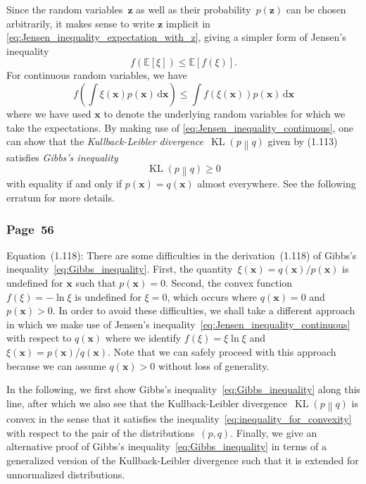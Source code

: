 \documentclass[12pt,a4paper]{article}
\newcommand{\erratum}[1]{%
\subsubsection*{#1}
\addcontentsline{toc}{subsection}{#1}}
\begin{document}
Since the random variables~$\mathbf{z}$ as well as their probability~$p(\mathbf{z})$ can be chosen
arbitrarily,
it makes sense to write $\mathbf{z}$ implicit in \eqref{eq:Jensen_inequality_expectation_with_z},
giving a simpler form of Jensen's inequality
\begin{equation}
f\left(\mathbb{E}\left[\xi\right]\right)
\leqslant \mathbb{E}\left[f\left(\xi\right)\right] .
\end{equation}
For continuous random variables, we have
\begin{equation}
f\left(\int\xi(\mathbf{x}) p(\mathbf{x}) \,\mathrm{d}\mathbf{x}\right) \leqslant
\int f\left(\xi(\mathbf{x})\right) p(\mathbf{x}) \,\mathrm{d}\mathbf{x}
\label{eq:Jensen_inequality_continuous}
\end{equation}
where we have used $\mathbf{x}$ to denote the underlying random variables
for which we take the expectations.
By making use of \eqref{eq:Jensen_inequality_continuous},
one can show that
the \emph{Kullback-Leibler divergence}~$\operatorname{KL}\left( p \middle\| q \right)$
given by (1.113) satisfies \emph{Gibbs's inequality}
\begin{equation}
\operatorname{KL}\left( p \middle\| q \right) \geqslant 0
\label{eq:Gibbs_inequality}
\end{equation}
with equality if and only if $p(\mathbf{x}) = q(\mathbf{x})$ almost everywhere.
See the following erratum for more details.

\erratum{Page~56}
Equation~(1.118):
There are some difficulties in the derivation~(1.118) of
Gibbs's inequality~\eqref{eq:Gibbs_inequality}.
First, the quantity~$\xi(\mathbf{x}) = q(\mathbf{x})/p(\mathbf{x})$ is undefined for $\mathbf{x}$
such that $p(\mathbf{x}) = 0$.
Second, the convex function~$f(\xi) = -\ln\xi$ is undefined for $\xi = 0$,
which occurs where $q(\mathbf{x}) = 0$ and $p(\mathbf{x}) > 0$.
In order to avoid these difficulties,
we shall take a different approach~\citep{MacKay:Information,KullbackLeibler:Information}
in which we make use of Jensen's inequality~\eqref{eq:Jensen_inequality_continuous}
with respect to $q(\mathbf{x})$ where
we identify $f(\xi) = \xi\ln\xi$ and
$\xi(\mathbf{x}) = p(\mathbf{x})/q(\mathbf{x})$.
Note that we can safely proceed with this approach
because we can assume $q(\mathbf{x}) > 0$ without loss of generality.

In the following, we first show Gibbs's inequality~\eqref{eq:Gibbs_inequality} along this line,
after which we also see that
the Kullback-Leibler divergence~$\operatorname{KL}\left(p\middle\|q\right)$ is convex
in the sense that it satisfies the inequality~\eqref{eq:inequality_for_convexity}
with respect to the pair of the distributions~$(p, q)$.
Finally, we give an alternative proof of Gibbs's inequality~\eqref{eq:Gibbs_inequality}
in terms of a generalized version of the Kullback-Leibler divergence such that
it is extended for unnormalized distributions.
\end{document}
